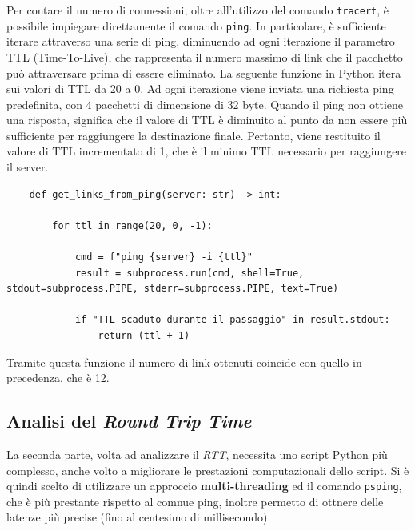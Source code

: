 \noindent Per contare il numero di connessioni, oltre all'utilizzo del comando \texttt{tracert}, è possibile impiegare direttamente il comando \texttt{ping}. In particolare, è sufficiente iterare attraverso una serie di ping, diminuendo ad ogni iterazione il parametro TTL (Time-To-Live), che rappresenta il numero massimo di link che il pacchetto può attraversare prima di essere eliminato. La seguente funzione in Python itera sui valori di TTL da 20 a 0. Ad ogni iterazione viene inviata una richiesta ping predefinita, con 4 pacchetti di dimensione di 32 byte. Quando il ping non ottiene una risposta, significa che il valore di TTL è diminuito al punto da non essere più sufficiente per raggiungere la destinazione finale. Pertanto, viene restituito il valore di TTL incrementato di 1, che è il minimo TTL necessario per raggiungere il server.

\begin{lstlisting}
    def get_links_from_ping(server: str) -> int:

        for ttl in range(20, 0, -1):

            cmd = f"ping {server} -i {ttl}"
            result = subprocess.run(cmd, shell=True, stdout=subprocess.PIPE, stderr=subprocess.PIPE, text=True)

            if "TTL scaduto durante il passaggio" in result.stdout:
                return (ttl + 1)
\end{lstlisting}

\noindent Tramite questa funzione il numero di link ottenuti coincide con quello in precedenza, che è 12.


\vspace{15px}\subsection{Analisi del \textsl{Round Trip Time}}\label{RTT}

La seconda parte, volta ad analizzare il \textsl{RTT}, necessita uno script Python più complesso, anche volto a migliorare le prestazioni computazionali dello script. Si è quindi scelto di utilizzare un approccio \textbf{multi-threading} ed il comando \texttt{psping}, che è più prestante rispetto al comnue ping, inoltre permetto di ottnere delle latenze più precise (fino al centesimo di millisecondo).

